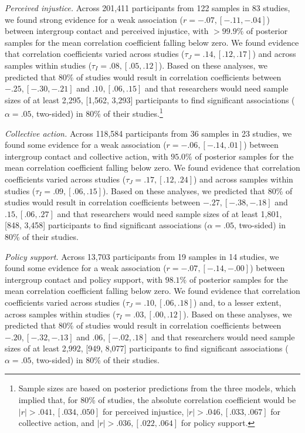 \documentclass[
]{article}
\begin{document}
\emph{Perceived injustice.} Across 201,411 participants from 122 samples
in 83 studies, we found strong evidence for a weak association
(\(r = -.07, [-.11, -.04]\)) between intergroup contact and perceived
injustice, with \(>99.9\%\) of posterior samples for the mean
correlation coefficient falling below zero. We found evidence that
correlation coefficients varied across studies
(\(\tau_J = .14, [.12, .17]\)) and across samples within studies
(\(\tau_I = .08, [.05, .12]\)). Based on these analyses, we predicted
that 80\% of studies would result in correlation coefficients between
\(-.25, [-.30, -.21]\) and \(.10, [.06, .15]\) and that researchers
would need sample sizes of at least 2,295, {[}1,562, 3,293{]}
participants to find significant associations (\(\alpha = .05\),
two-sided) in 80\% of their studies.\footnote{Sample sizes are based on
  posterior predictions from the three models, which implied that, for
  80\% of studies, the absolute correlation coefficient would be
  \(|r| > .041, [.034, .050]\) for perceived injustice,
  \(|r| > .046, [.033, .067]\) for collective action, and
  \(|r| > .036, [.022, .064]\) for policy support.}

\emph{Collective action.} Across 118,584 participants from 36 samples in
23 studies, we found some evidence for a weak association
(\(r = -.06, [-.14, .01]\)) between intergroup contact and collective
action, with \(95.0\%\) of posterior samples for the mean correlation
coefficient falling below zero. We found evidence that correlation
coefficients varied across studies (\(\tau_J = .17, [.12, .24]\)) and
across samples within studies (\(\tau_I = .09, [.06, .15]\)). Based on
these analyses, we predicted that 80\% of studies would result in
correlation coefficients between \(-.27, [-.38, -.18]\) and
\(.15, [.06, .27]\) and that researchers would need sample sizes of at
least 1,801, {[}848, 3,458{]} participants to find significant
associations (\(\alpha = .05\), two-sided) in 80\% of their studies.

\emph{Policy support.} Across 13,703 participants from 19 samples in 14
studies, we found some evidence for a weak association
(\(r = -.07, [-.14, -.00]\)) between intergroup contact and policy
support, with \(98.1\%\) of posterior samples for the mean correlation
coefficient falling below zero. We found evidence that correlation
coefficients varied across studies (\(\tau_J = .10, [.06, .18]\)) and,
to a lesser extent, across samples within studies
(\(\tau_I = .03, [.00, .12]\)). Based on these analyses, we predicted
that 80\% of studies would result in correlation coefficients between
\(-.20, [-.32, -.13]\) and \(.06, [-.02, .18]\) and that researchers
would need sample sizes of at least 2,992, {[}949, 8,077{]} participants
to find significant associations (\(\alpha = .05\), two-sided) in 80\%
of their studies.
\end{document}
